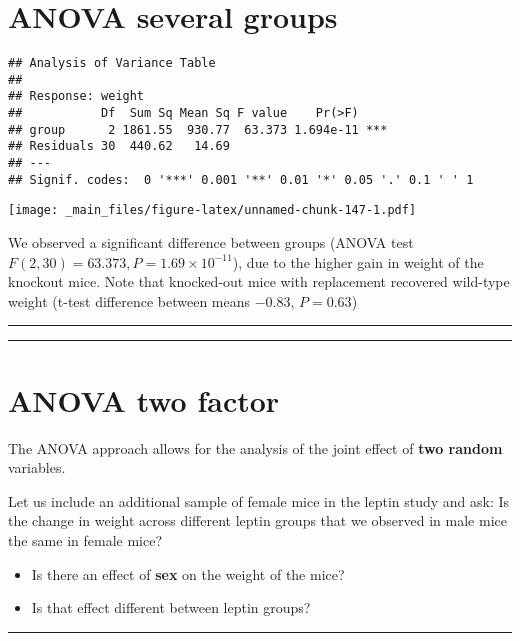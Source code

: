 \documentclass[
]{book}
\begin{document}
\hypertarget{anova-several-groups-4}{%
\section{ANOVA several groups}\label{anova-several-groups-4}}

\begin{verbatim}
## Analysis of Variance Table
## 
## Response: weight
##           Df  Sum Sq Mean Sq F value    Pr(>F)    
## group      2 1861.55  930.77  63.373 1.694e-11 ***
## Residuals 30  440.62   14.69                      
## ---
## Signif. codes:  0 '***' 0.001 '**' 0.01 '*' 0.05 '.' 0.1 ' ' 1
\end{verbatim}

\texttt{[image: \_main\_files/figure-latex/unnamed-chunk-147-1.pdf]}

We observed a significant difference between groups (ANOVA test \(F(2,30)=63.373, P= 1.69 \times 10^{-11}\)), due to the higher gain in weight of the knockout mice. Note that knocked-out mice with replacement recovered wild-type weight (t-test difference between means \(-0.83\), \(P=0.63\))

\begin{center}\rule{0.5\linewidth}{0.5pt}\end{center}

\begin{center}\rule{0.5\linewidth}{0.5pt}\end{center}

\hypertarget{anova-two-factor}{%
\section{ANOVA two factor}\label{anova-two-factor}}

The ANOVA approach allows for the analysis of the joint effect of \textbf{two random} variables.

Let us include an additional sample of female mice in the leptin study and ask: Is the change in weight across different leptin groups that we observed in male mice the same in female mice?

\begin{itemize}
\item
  Is there an effect of \textbf{sex} on the weight of the mice?
\item
  Is that effect different between leptin groups?
\end{itemize}

\begin{center}\rule{0.5\linewidth}{0.5pt}\end{center}
\end{document}

